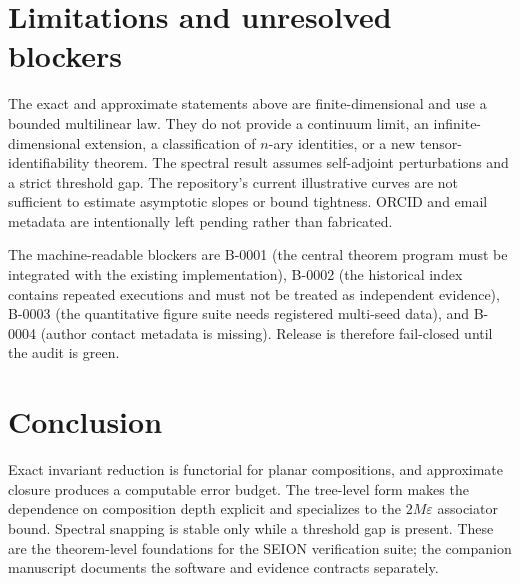 \documentclass[11pt]{article}
\begin{document}
\section{Limitations and unresolved blockers}

The exact and approximate statements above are finite-dimensional and use a bounded multilinear law. They do not provide a continuum limit, an infinite-dimensional extension, a classification of $n$-ary identities, or a new tensor-identifiability theorem. The spectral result assumes self-adjoint perturbations and a strict threshold gap. The repository's current illustrative curves are not sufficient to estimate asymptotic slopes or bound tightness. ORCID and email metadata are intentionally left pending rather than fabricated.

The machine-readable blockers are B-0001 (the central theorem program must be integrated with the existing implementation), B-0002 (the historical index contains repeated executions and must not be treated as independent evidence), B-0003 (the quantitative figure suite needs registered multi-seed data), and B-0004 (author contact metadata is missing). Release is therefore fail-closed until the audit is green.

\section{Conclusion}

Exact invariant reduction is functorial for planar compositions, and approximate closure produces a computable error budget. The tree-level form makes the dependence on composition depth explicit and specializes to the $2M\varepsilon$ associator bound. Spectral snapping is stable only while a threshold gap is present. These are the theorem-level foundations for the SEION verification suite; the companion manuscript documents the software and evidence contracts separately.



\end{document}
